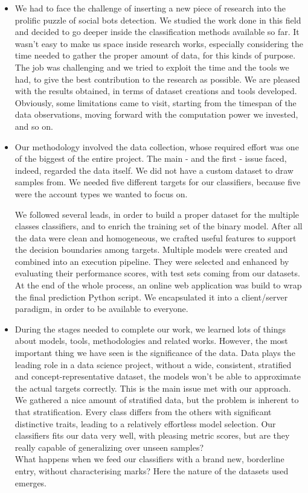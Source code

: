 \begin{itemize}
\item[\PencilRight] We had to face the challenge of inserting a new piece of research into the prolific puzzle of social bots detection. We studied the work done in this field and decided to go deeper inside the classification methods available so far. It wasn't easy to make us space inside research works, especially considering the time needed to gather the proper amount of data, for this kinds of purpose. The job was challenging and we tried to exploit the time and the tools we had, to give the best contribution to the research as possible. We are pleased with the results obtained, in terms of dataset creations and tools developed. Obviously, some limitations came to visit, starting from the timespan of the data observations, moving forward with the computation power we invested, and so on.
\item[\PencilRight] Our methodology involved the data collection, whose required effort was one of the biggest of the entire project. The main - and the first - issue faced, indeed, regarded the data itself. We did not have a custom dataset to draw samples from. We needed five different targets for our classifiers, because five were the account types we wanted to focus on. 

We followed several leads, in order to build a proper dataset for the multiple classes classifiers, and to enrich the training set of the binary model. After all the data were clean and homogeneous, we crafted useful features to support the decision boundaries among targets. Multiple models were created and combined into an execution pipeline. They were selected and enhanced by evaluating their performance scores, with test sets coming from our datasets. 
At the end of the whole process, an online web application was build to wrap the final prediction Python script. We encapsulated it into a client/server paradigm, in order to be available to everyone.

\item[\PencilRight] During the stages needed to complete our work, we learned lots of things about models, tools, methodologies and related works. However, the most important thing we have seen is the significance of the data. Data plays the leading role in a data science project, without a wide, consistent, stratified and concept-representative dataset, the models won't be able to approximate the actual targets correctly. This is the main issue met with our approach.
We gathered a nice amount of stratified data, but the problem is inherent to that stratification. Every class differs from the others with significant distinctive traits, leading to a relatively effortless model selection. Our classifiers fits our data very well, with pleasing metric scores, but are they really capable of generalizing over unseen samples?\\
What happens when we feed our classifiers with a brand new, borderline entry, without characterising marks? Here the nature of the datasets used emerges.


\end{itemize}

